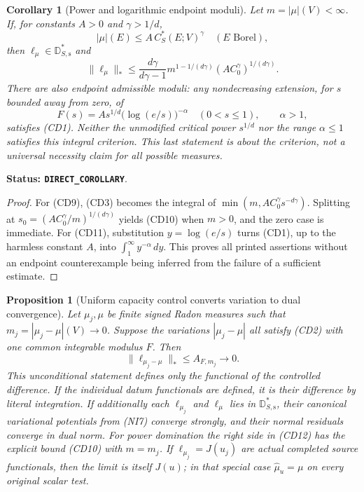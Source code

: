 \documentclass[11pt,a4paper]{article}
\numberwithin{equation}{section}
\newtheorem{proposition}[theorem]{Proposition}
\newtheorem{corollary}[theorem]{Corollary}
\theoremstyle{definition}
\theoremstyle{remark}
\begin{document}
\begin{corollary}[Power and logarithmic endpoint moduli]
\label{cor:r12-power-capacity-dual-data}
Let $m=|\mu|(V)<\infty$. If, for constants $A>0$ and
$\gamma>1/d$,
\[
                 |\mu|(E)\leq A\,C_S^*(E;V)^\gamma
                    \quad(E\text{ Borel}),
 \tag{CD9}
\]
then $\ell_\mu\in\mathbb D_{S,\mathrm s}^*$ and
\[
 \|\ell_\mu\|_*
 \leq \frac{d\gamma}{d\gamma-1}
       m^{1-1/(d\gamma)}
                  (A C_0^\gamma)^{1/(d\gamma)}.
 \tag{CD10}
\]
There are also endpoint admissible moduli: any nondecreasing
extension, for $s$ bounded away from zero, of
\[
             F(s)=A s^{1/d}\bigl(\log(e/s)\bigr)^{-\alpha}
                   \quad(0<s\leq1),\qquad \alpha>1,
 \tag{CD11}
\]
satisfies (CD1). Neither the unmodified critical power
$s^{1/d}$ nor the range $\alpha\leq1$ satisfies this
integral criterion. This last statement is about the criterion,
not a universal necessity claim for all possible measures.
\end{corollary}

\noindent\textbf{Status: \texttt{DIRECT\_COROLLARY}}.

\begin{proof}
For (CD9), (CD3) becomes the integral of
$\min(m,A C_0^\gamma s^{-d\gamma})$. Splitting at
$s_0=(A C_0^\gamma/m)^{1/(d\gamma)}$ yields (CD10) when
$m>0$, and the zero case is immediate. For (CD11), substitution
$y=\log(e/s)$ turns (CD1), up to the harmless constant $A$,
into $\int_1^\infty y^{-\alpha}\,dy$. This proves all printed
assertions without an endpoint counterexample being inferred
from the failure of a sufficient estimate.
\end{proof}

\begin{proposition}[Uniform capacity control converts variation to dual convergence]
\label{prop:r12-capacity-dini-data-stability}
Let $\mu_j,\mu$ be finite signed Radon measures such that
$m_j=|\mu_j-\mu|(V)\to0$. Suppose the variations
$|\mu_j-\mu|$ all satisfy (CD2) with one common integrable
modulus $F$. Then
\[
         \|\ell_{\mu_j-\mu}\|_*
                \leq A_{F,m_j}\longrightarrow0.
 \tag{CD12}
\]
This unconditional statement defines only the functional of the
controlled difference. If the individual datum functionals are
defined, it is their difference by literal integration.
If additionally each $\ell_{\mu_j}$ and $\ell_\mu$ lies in
$\mathbb D_{S,\mathrm s}^*$, their canonical variational
potentials from (NI7) converge strongly, and their normal
residuals converge in dual norm. For power domination the
right side in (CD12) has the explicit bound (CD10) with
$m=m_j$. If $\ell_{\mu_j}=J(u_j)$ are actual completed source
functionals, then the limit is itself $J(u)$; in that special
case $\widehat\mu_u=\mu$ on every original scalar test.
\end{proposition}
\end{document}
